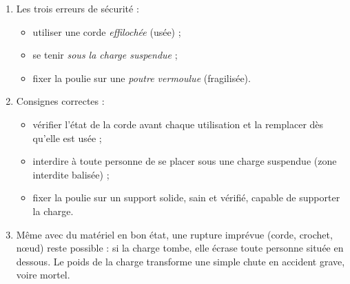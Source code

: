 \documentclass[11pt]{article}
\begin{document}
\begin{corrige}
\begin{enumerate}
\item Les trois erreurs de sécurité :
\begin{itemize}
\item utiliser une corde \emph{effilochée} (usée) ;
\item se tenir \emph{sous la charge suspendue} ;
\item fixer la poulie sur une \emph{poutre vermoulue} (fragilisée).
\end{itemize}
\item Consignes correctes :
\begin{itemize}
\item vérifier l'état de la corde avant chaque utilisation et la remplacer dès qu'elle est usée ;
\item interdire à toute personne de se placer sous une charge suspendue (zone interdite balisée) ;
\item fixer la poulie sur un support solide, sain et vérifié, capable de supporter la charge.
\end{itemize}
\item Même avec du matériel en bon état, une rupture imprévue (corde, crochet, nœud) reste possible : si la charge tombe, elle écrase toute personne située en dessous. Le poids de la charge transforme une simple chute en accident grave, voire mortel.
\end{enumerate}
\end{corrige}
\end{document}
